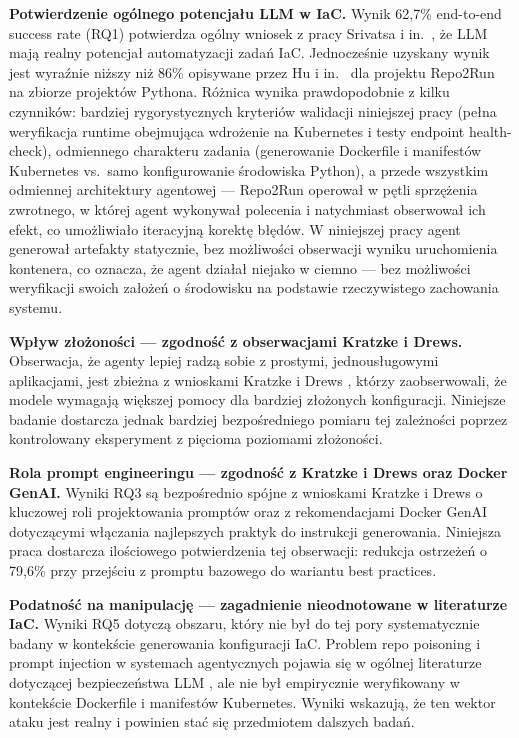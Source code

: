 \textbf{Potwierdzenie ogólnego potencjału LLM w IaC.} Wynik 62{,}7\% end-to-end success rate (RQ1) potwierdza ogólny wniosek z pracy Srivatsa i in.\ \cite{srivatsa_survey_2024}, że LLM mają realny potencjał automatyzacji zadań IaC. Jednocześnie uzyskany wynik jest wyraźnie niższy niż 86\% opisywane przez Hu i in.\ \cite{hu_llm-based_2025} dla projektu Repo2Run na zbiorze projektów Pythona. Różnica wynika prawdopodobnie z kilku czynników: bardziej rygorystycznych kryteriów walidacji niniejszej pracy (pełna weryfikacja runtime obejmująca wdrożenie na Kubernetes i testy endpoint health-check), odmiennego charakteru zadania (generowanie Dockerfile i manifestów Kubernetes vs.\ samo konfigurowanie środowiska Python), a przede wszystkim odmiennej architektury agentowej — Repo2Run operował w pętli sprzężenia zwrotnego, w której agent wykonywał polecenia i natychmiast obserwował ich efekt, co umożliwiało iteracyjną korektę błędów. W niniejszej pracy agent generował artefakty statycznie, bez możliwości obserwacji wyniku uruchomienia kontenera, co oznacza, że agent działał niejako w ciemno — bez możliwości weryfikacji swoich założeń o środowisku na podstawie rzeczywistego zachowania systemu.

\textbf{Wpływ złożoności — zgodność z obserwacjami Kratzke i Drews.} Obserwacja, że agenty lepiej radzą sobie z prostymi, jednousługowymi aplikacjami, jest zbieżna z wnioskami Kratzke i Drews \cite{kratzke_dont_2024}, którzy zaobserwowali, że modele wymagają większej pomocy dla bardziej złożonych konfiguracji. Niniejsze badanie dostarcza jednak bardziej bezpośredniego pomiaru tej zależności poprzez kontrolowany eksperyment z pięcioma poziomami złożoności.

\textbf{Rola prompt engineeringu — zgodność z Kratzke i Drews oraz Docker GenAI.} Wyniki RQ3 są bezpośrednio spójne z wnioskami Kratzke i Drews \cite{kratzke_dont_2024} o kluczowej roli projektowania promptów oraz z rekomendacjami Docker GenAI \cite{docker_genai} dotyczącymi włączania najlepszych praktyk do instrukcji generowania. Niniejsza praca dostarcza ilościowego potwierdzenia tej obserwacji: redukcja ostrzeżeń o 79{,}6\% przy przejściu z promptu bazowego do wariantu best practices.

\textbf{Podatność na manipulację — zagadnienie nieodnotowane w literaturze IaC.} Wyniki RQ5 dotyczą obszaru, który nie był do tej pory systematycznie badany w kontekście generowania konfiguracji IaC. Problem repo poisoning i prompt injection w systemach agentycznych pojawia się w ogólnej literaturze dotyczącej bezpieczeństwa LLM \cite{zhao_survey_2025}, ale nie był empirycznie weryfikowany w kontekście Dockerfile i manifestów Kubernetes. Wyniki wskazują, że ten wektor ataku jest realny i powinien stać się przedmiotem dalszych badań.

